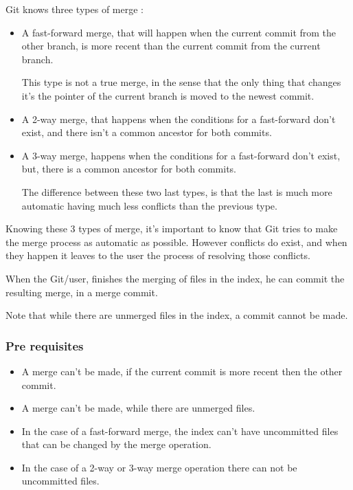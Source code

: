 Git knows three types of merge : 
\begin{itemize}
\item A fast-forward merge, that will happen when 
the current commit from the other
branch, is more recent than the current commit from the current branch. \par
This type is not a true merge, in the sense that the only thing that
changes it's the pointer of the current branch
is moved to the newest commit.

\item A 2-way merge, that happens when the conditions for a fast-forward
don't exist, and there isn't a common ancestor for both commits.

\item A 3-way merge, happens when the conditions for a fast-forward
don't exist, but, there is a common ancestor for both commits. \par
The difference between these two last types, is that the last is much 
more automatic having much less conflicts than the previous type.
\end{itemize}
Knowing these 3 types of merge, it's important to know that Git tries to make
the merge process as automatic as possible. However conflicts do exist, and when
they happen it leaves to the user the process of resolving those conflicts. \par
When the Git/user, finishes the merging of files in the index, he
can commit the resulting merge, in a merge commit. \par
Note that while there are unmerged files in the index, a commit cannot be
made. \par 

\subsubsection{Pre requisites}

\begin{itemize}
\item A merge can't be made, if the current commit is more recent then the
other commit.
\item A merge can't be made, while there are unmerged files.
\item In the case of a fast-forward merge, the index can't have uncommitted
files that can be changed by the merge operation.
\item In the case of a 2-way or 3-way merge operation there can not be
uncommitted files. 
\end{itemize}


